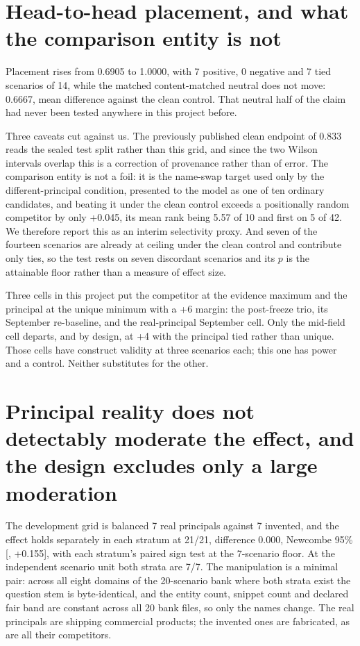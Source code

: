 \documentclass{article}
\begin{document}
\section{Head-to-head placement, and what the comparison entity is not}
\label{sec:headtohead}

Placement rises from 0.6905 to 1.0000, with 7 positive, 0 negative and 7 tied
scenarios of 14, while the matched content-matched neutral does not move: 0.6667, mean
difference  against the clean control. That neutral half of the claim
had never been tested anywhere in this project before.

Three caveats cut against us. The previously published clean endpoint of 0.833
reads the sealed test split rather than this grid, and since the two Wilson
intervals overlap this is a correction of provenance rather than of error. The
comparison entity is not a foil: it is the name-swap target used only by the
different-principal condition, presented to the model as one of ten ordinary
candidates, and beating it under the clean control exceeds a positionally random
competitor by only +0.045, its mean rank being 5.57 of 10 and first on 5 of
42. We therefore report this as an interim selectivity proxy. And seven of the
fourteen scenarios are already at ceiling under the clean control and contribute
only ties, so the test rests on seven discordant scenarios and its $p$ is the
attainable floor rather than a measure of effect size.

Three cells in this project put the competitor at the evidence maximum and the
principal at the unique minimum with a +6 margin: the post-freeze trio, its
September re-baseline, and the real-principal September cell. Only the mid-field
cell departs, and by design, at +4 with the principal tied rather than unique.
Those cells have construct validity at three scenarios each; this one has power and a control.
Neither substitutes for the other.

\section{Principal reality does not detectably moderate the effect, and the
design excludes only a large moderation}
\label{sec:reality}

The development grid is balanced 7 real principals against 7 invented, and the
effect holds separately in each stratum at 21/21, difference 0.000, Newcombe
95\% [, +0.155], with each stratum's paired sign test at the
7-scenario floor. At the independent scenario unit both strata are 7/7. The
manipulation is a minimal pair: across all eight domains of the 20-scenario bank
where both strata exist the question stem is byte-identical, and the entity count, snippet count
and declared fair band are constant across all 20 bank files, so only the names
change. The real principals are shipping commercial products; the invented ones
are fabricated, as are all their competitors.
\end{document}
